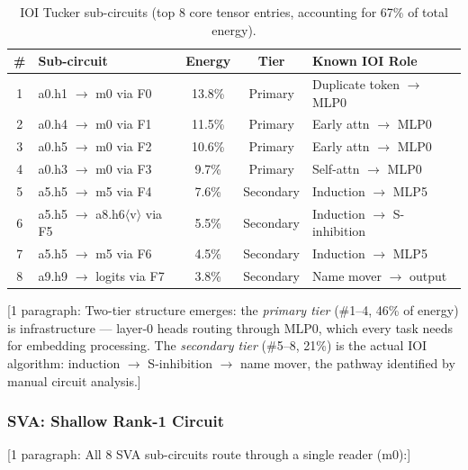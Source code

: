 \documentclass[11pt]{article}
\begin{document}
\begin{table}[h]
\centering
\caption{IOI Tucker sub-circuits (top 8 core tensor entries, accounting
for 67\% of total energy).}
\label{tab:ioi_subcircuits}
\begin{tabular}{clccl}
\toprule
\textbf{\#} & \textbf{Sub-circuit} & \textbf{Energy} & \textbf{Tier} & \textbf{Known IOI Role} \\
\midrule
1 & a0.h1 $\to$ m0 via F0 & 13.8\% & Primary & Duplicate token $\to$ MLP0 \\
2 & a0.h4 $\to$ m0 via F1 & 11.5\% & Primary & Early attn $\to$ MLP0 \\
3 & a0.h5 $\to$ m0 via F2 & 10.6\% & Primary & Early attn $\to$ MLP0 \\
4 & a0.h3 $\to$ m0 via F3 & 9.7\%  & Primary & Self-attn $\to$ MLP0 \\
5 & a5.h5 $\to$ m5 via F4 & 7.6\%  & Secondary & Induction $\to$ MLP5 \\
6 & a5.h5 $\to$ a8.h6$\langle$v$\rangle$ via F5 & 5.5\% & Secondary & Induction $\to$ S-inhibition \\
7 & a5.h5 $\to$ m5 via F6 & 4.5\%  & Secondary & Induction $\to$ MLP5 \\
8 & a9.h9 $\to$ logits via F7 & 3.8\% & Secondary & Name mover $\to$ output \\
\bottomrule
\end{tabular}
\end{table}

[1 paragraph: Two-tier structure emerges: the \emph{primary tier}
(\#1--4, 46\% of energy) is infrastructure --- layer-0 heads routing
through MLP0, which every task needs for embedding processing. The
\emph{secondary tier} (\#5--8, 21\%) is the actual IOI algorithm:
induction $\to$ S-inhibition $\to$ name mover, the pathway identified
by manual circuit analysis.]

\subsubsection{SVA: Shallow Rank-1 Circuit}


[1 paragraph: All 8 SVA sub-circuits route through a single reader (m0):]
\end{document}
